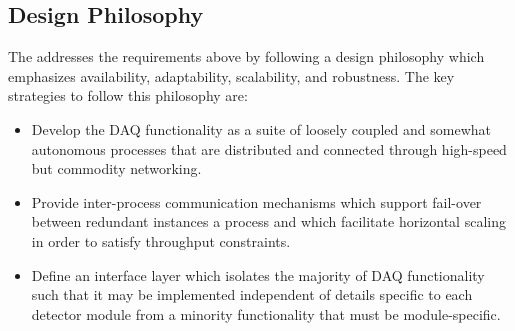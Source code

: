 \begin{dunetable}
\end{dunetable}

\subsection{Design Philosophy}

The    addresses the requirements above by following a
design philosophy which emphasizes availability, adaptability, scalability, and robustness.
The key strategies to follow this philosophy are:

\begin{itemize}
\item Develop the DAQ functionality as a suite of loosely coupled and somewhat autonomous processes that are distributed and connected through high-speed but commodity networking.
\item Provide inter-process communication mechanisms which support fail-over between redundant instances a process and which facilitate horizontal scaling in order to satisfy throughput constraints.
\item Define an interface layer which isolates the majority of DAQ functionality such that it may be implemented independent of details specific to each detector module from a minority functionality that must be module-specific.
\end{itemize}

